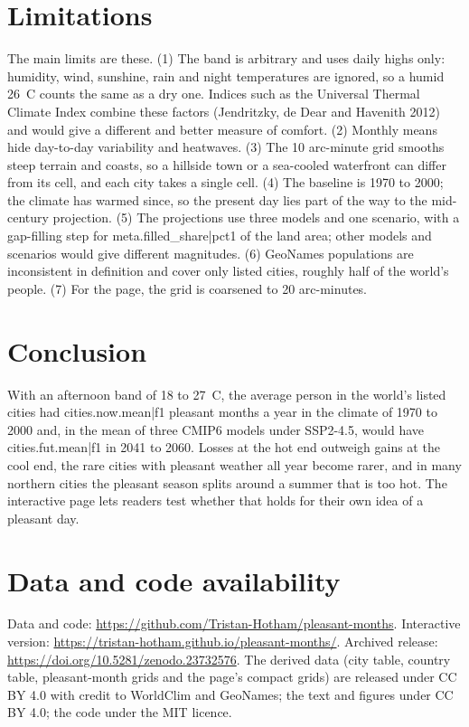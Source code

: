 \documentclass[11pt,a4paper]{article}
\begin{document}
\section{Limitations}\label{sec:limits}

The main limits are these. (1) The band is arbitrary and uses daily highs only: humidity, wind, sunshine, rain and night temperatures are ignored, so a humid 26~\textdegree C counts the same as a dry one. Indices such as the Universal Thermal Climate Index combine these factors (Jendritzky, de Dear and Havenith 2012) and would give a different and better measure of comfort. (2) Monthly means hide day-to-day variability and heatwaves. (3) The 10 arc-minute grid smooths steep terrain and coasts, so a hillside town or a sea-cooled waterfront can differ from its cell, and each city takes a single cell. (4) The baseline is 1970 to 2000; the climate has warmed since, so the present day lies part of the way to the mid-century projection. (5) The projections use three models and one scenario, with a gap-filling step for {{meta.filled_share|pct1}} of the land area; other models and scenarios would give different magnitudes. (6) GeoNames populations are inconsistent in definition and cover only listed cities, roughly half of the world's people. (7) For the page, the grid is coarsened to 20 arc-minutes.

\section{Conclusion}

With an afternoon band of 18 to 27~\textdegree C, the average person in the world's listed cities had {{cities.now.mean|f1}} pleasant months a year in the climate of 1970 to 2000 and, in the mean of three CMIP6 models under SSP2-4.5, would have {{cities.fut.mean|f1}} in 2041 to 2060. Losses at the hot end outweigh gains at the cool end, the rare cities with pleasant weather all year become rarer, and in many northern cities the pleasant season splits around a summer that is too hot. The interactive page lets readers test whether that holds for their own idea of a pleasant day.

\section*{Data and code availability}

Data and code: \url{https://github.com/Tristan-Hotham/pleasant-months}. Interactive version: \url{https://tristan-hotham.github.io/pleasant-months/}. Archived release: \url{https://doi.org/10.5281/zenodo.23732576}. The derived data (city table, country table, pleasant-month grids and the page's compact grids) are released under CC BY 4.0 with credit to WorldClim and GeoNames; the text and figures under CC BY 4.0; the code under the MIT licence.
\end{document}
